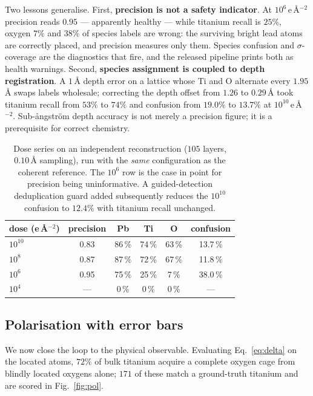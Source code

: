 \documentclass[aps,prb,twocolumn,superscriptaddress,floatfix,nofootinbib]{revtex4-2}
\begin{document}
Two lessons generalise. First, \textbf{precision is not a safety indicator}. At
$10^{6}$\,e\,\AA$^{-2}$ precision reads $0.95$ --- apparently healthy --- while titanium recall
is $25\%$, oxygen $7\%$ and $38\%$ of species labels are wrong: the surviving bright lead atoms
are correctly placed, and precision measures only them. Species confusion and $\sigma$-coverage
are the diagnostics that fire, and the released pipeline prints both as health warnings.
Second, \textbf{species assignment is coupled to depth registration}. A $1$\,\AA{} depth error
on a lattice whose Ti and O alternate every $1.95$\,\AA{} swaps labels wholesale; correcting the
depth offset from $1.26$ to $0.29$\,\AA{} took titanium recall from $53\%$ to $74\%$ and
confusion from $19.0\%$ to $13.7\%$ at $10^{10}$\,e\,\AA$^{-2}$. Sub-\aa{}ngstr\"om depth
accuracy is not merely a precision figure; it is a prerequisite for correct chemistry.

\begin{table}[t]
  \centering \small
  \begin{tabular}{@{}lccccc@{}}
    \toprule
    dose (e\,\AA$^{-2}$) & precision & Pb & Ti & O & confusion \\
    \midrule
    $10^{10}$ & 0.83 & 86\,\% & 74\,\% & 63\,\% & 13.7\,\% \\
    $10^{8}$  & 0.87 & 87\,\% & 72\,\% & 67\,\% & 11.8\,\% \\
    $10^{6}$  & 0.95 & 75\,\% & 25\,\% & \phantom{0}7\,\% & 38.0\,\% \\
    $10^{4}$  & ---  & \phantom{0}0\,\% & \phantom{0}0\,\% & \phantom{0}0\,\% & --- \\
    \bottomrule
  \end{tabular}
  \caption{Dose series on an independent reconstruction ($105$ layers, $0.10$\,\AA{} sampling),
    run with the \emph{same} configuration as the coherent reference. The $10^{6}$ row is the
    case in point for precision being uninformative. A guided-detection deduplication guard
    added subsequently reduces the $10^{10}$ confusion to $12.4\%$ with titanium recall
    unchanged.}
  \label{tab:dose}
\end{table}

\subsection{Polarisation with error bars}
\label{sec:pol}

We now close the loop to the physical observable. Evaluating Eq.~\eqref{eq:delta} on the
located atoms, $72\%$ of bulk titanium acquire a complete oxygen cage from blindly located
oxygens alone; $171$ of these match a ground-truth titanium and are scored in
Fig.~\ref{fig:pol}.
\end{document}
